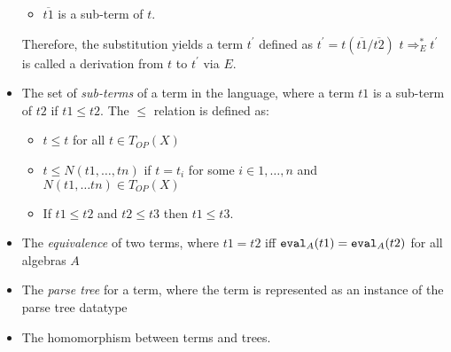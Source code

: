 \begin{itemize}
\begin{itemize}
			\item $\overline{t1}$ is a sub-term of $t$. 
		\end{itemize}
		Therefore, the substitution yields a term $t^{\prime}$ defined as $t^{\prime} = t(\overline{t1}/\overline{t2})$\newline
		$t \Rightarrow_{E}^{*} t^{\prime}$ is called a derivation from $t$ to $t^{\prime}$ via $E$. 
		\item The set of \emph{sub-terms} of a term in the language, where a 
		term $t1$ is a sub-term of $t2$ if $t1 \leq t2$. The $\leq$ relation is defined as: 
		\begin{itemize}
			\item $t \leq t$ for all $t \in T_{OP}(X)$
			\item $t \leq N(t1, \ldots, tn)$ if $t = t_i$ for some $i \in {1, \ldots, n}$ and $N(t1, \ldots tn) \in T_{OP}(X)$
			\item If $t1 \leq t2$ and $t2 \leq t3$ then $t1 \leq t3$. 
		\end{itemize}
		\item The \textit{equivalence} of two terms, where $t1 = t2$ iff $\operatorname{\mathtt{eval}}_A(t1) = 
		\operatorname{\mathtt{eval}}_A(t2)$ 
		for all algebras $A$
		\begin{comment}
		\item The \textit{quotient} term algebra \ednote{Is this different than the quotient algebra?}
	Given a specification $SPEC$, the quotient term algebra $T_{SPEC} = ((Q_{s})_{s\in S}, 
	(N_Q)_{N \in OP})$ can be defined as
	\begin{itemize}
	\item For each sort $s \in S$, there is a base set $Q_s = \{[t]$  $| t \in T_{OP,s}\}$ where 
	the congruence class of $t$ s defined as $[t] = \{t^{\prime}$  $|  t^{\prime} \equiv t\}$
	\item For each constant symbol $N : \rightarrow s$ in $OP$, the constant $N_Q$ is the 
	congruence class generated by $N$; $N_Q = [N]$
	\item For each operation symbol, $N : s1, \ldots, sn \rightarrow s$, in $OP$, the operation 
	$N_Q : Q_{s1} \times \ldots \times Q_{sn} \rightarrow Q_{s}$ is defined as $N_Q([t1] \times 
	\ldots \times [tn]) = [N(t1, \ldots tn)]$. 
	\end{itemize}	
			\end{comment}
		\item The \emph{parse tree} for a term, where the term is represented as an instance of the 
		parse tree datatype 
		\item The homomorphism between terms and trees.
\end{itemize}